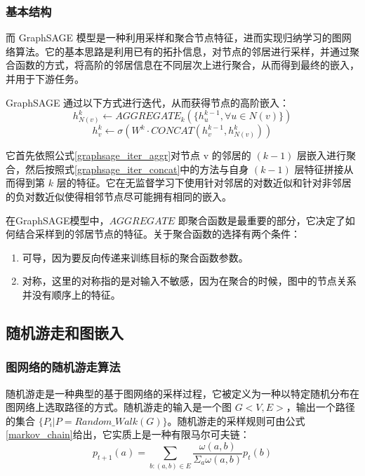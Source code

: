 \subsubsection{基本结构}

而 GraphSAGE 模型是一种利用采样和聚合节点特征，进而实现归纳学习的图网络算法。它的基本思路是利用已有的拓扑信息，对节点的邻居进行采样，并通过聚合函数的方式，将高阶的邻居信息在不同层次上进行聚合，从而得到最终的嵌入，并用于下游任务。

GraphSAGE 通过以下方式进行迭代，从而获得节点的高阶嵌入：
\begin{equation} \label{graphsage_iter_aggr}
h^k_{N(v)} \leftarrow AGGREGATE_k(\{ h_u^{k-1}, \forall u \in N(v)\})
\end{equation}
\begin{equation} \label{graphsage_iter_concat}
    h^k_v \leftarrow \sigma(W^k \cdot CONCAT(h_v^{k-1}, h^k_{N(v)}))
\end{equation}

它首先依照公式\ref{graphsage_iter_aggr}对节点 v 的邻居的 $(k-1)$ 层嵌入进行聚合，然后按照式\ref{graphsage_iter_concat}中的方法与自身 $(k-1)$ 层特征拼接从而得到第 $k$ 层的特征。它在无监督学习下使用针对邻居的对数近似和针对非邻居的负对数近似使得相邻节点尽可能拥有相同的嵌入。

在GraphSAGE模型中，$AGGREGATE$ 即聚合函数是最重要的部分，它决定了如何结合采样到的邻居节点的特征。关于聚合函数的选择有两个条件：

\begin{enumerate}
    \item 可导，因为要反向传递来训练目标的聚合函数参数。
    \item 对称，这里的对称指的是对输入不敏感，因为在聚合的时候，图中的节点关系并没有顺序上的特征。
\end{enumerate}

\subsection{随机游走和图嵌入}

\subsubsection{图网络的随机游走算法}

随机游走是一种典型的基于图网络的采样过程，它被定义为一种以特定随机分布在图网络上选取路径的方式。随机游走的输入是一个图 $G<V,E>$，输出一个路径的集合 $\{ P_i|P = Random\_Walk(G) \}$。随机游走的采样规则可由公式\ref{markov_chain}给出，它实质上是一种有限马尔可夫链：
\begin{equation} \label{markov_chain}
p_{t+1}(a) = \sum_{b:(a,b)\in E} \frac{\omega(a,b)}{\Sigma_{a}\omega(a,b)} p_t(b)
\end{equation}

